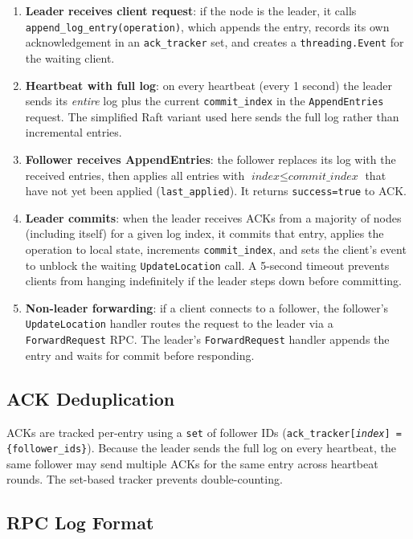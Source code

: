 \documentclass[11pt]{article}
\newcommand{\rpc}[1]{\texttt{#1}}
\begin{document}
\begin{enumerate}
  \item \textbf{Leader receives client request}: if the node is the leader, it calls
    \texttt{append\_log\_entry(operation)}, which appends the entry, records its own
    acknowledgement in an \texttt{ack\_tracker} set, and creates a \texttt{threading.Event}
    for the waiting client.
  \item \textbf{Heartbeat with full log}: on every heartbeat (every 1 second) the leader
    sends its \emph{entire} log plus the current \texttt{commit\_index} in the
    \rpc{AppendEntries} request.  The simplified Raft variant used here sends the full
    log rather than incremental entries.
  \item \textbf{Follower receives AppendEntries}: the follower replaces its log with the
    received entries, then applies all entries with
    $\textit{index} \le \textit{commit\_index}$ that have not yet been applied
    (\texttt{last\_applied}).  It returns \texttt{success=true} to ACK.
  \item \textbf{Leader commits}: when the leader receives ACKs from a majority of nodes
    (including itself) for a given log index, it commits that entry, applies the operation
    to local state, increments \texttt{commit\_index}, and sets the client's event to
    unblock the waiting \rpc{UpdateLocation} call.  A 5-second timeout prevents clients
    from hanging indefinitely if the leader steps down before committing.
  \item \textbf{Non-leader forwarding}: if a client connects to a follower, the follower's
    \rpc{UpdateLocation} handler routes the request to the leader via a
    \rpc{ForwardRequest} RPC.
    The leader's \rpc{ForwardRequest} handler appends the entry and waits for commit
    before responding.
\end{enumerate}

\subsection{ACK Deduplication}

ACKs are tracked per-entry using a \texttt{set} of follower IDs
(\texttt{ack\_tracker[\textit{index}] = \{follower\_ids\}}).
Because the leader sends the full log on every heartbeat, the same follower may send
multiple ACKs for the same entry across heartbeat rounds.
The set-based tracker prevents double-counting.

\subsection{RPC Log Format}
\end{document}
